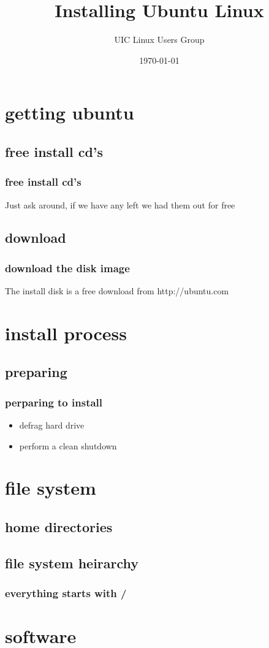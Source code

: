 \documentclass[hyperref={pdfpagelabels=false}]{beamer}
\title{Installing Ubuntu Linux}
\author{UIC Linux Users Group}
\date{\today}
\begin{document}
\frame{\titlepage}
\section[outline]{}
\frame{\tableofcontents}
\section{getting ubuntu}
\subsection{free install cd's}
\frame
{
    \frametitle{free install cd's}
    Just ask around, if we have any left we had them out for free
}
\subsection{download}
\frame
{
    \frametitle{download the disk image}
    The install disk is a free download from http://ubuntu.com
}
\section{install process}
\subsection{preparing}
\frame
{
    \frametitle{perparing to install}
    \begin{itemize}
    \item{defrag hard drive}
    \item{perform a clean shutdown}
    \end{itemize}
}
\section{file system}
\subsection{home directories}
\subsection{file system heirarchy}
\frame
{
    \frametitle{everything starts with /}
    
}
\section{software}
\end{document}
